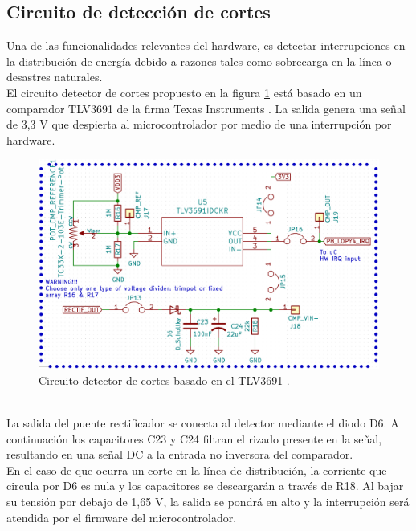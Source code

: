  \subsection{Circuito de detección de cortes}
 Una de las funcionalidades relevantes del hardware, es detectar interrupciones en la distribución de energía debido a razones tales como sobrecarga en la línea o desastres naturales.\\
 El circuito detector de cortes propuesto en la figura \ref{fig:ctodetectorcortes} está basado en un comparador TLV3691 de la firma Texas Instruments \citep{tlv3691}. La salida genera una señal de 3,3 V que despierta al microcontrolador por medio de una interrupci\'{o}n por hardware.\\
 \begin{figure}[h]
 	\centering
 	\includegraphics[width=0.9\linewidth]{Figures/cto_detector_cortes}
 	\caption{Circuito detector de cortes basado en el TLV3691 \citep{tlv3691}.}
 	\label{fig:ctodetectorcortes}
 \end{figure}\\
 La salida del puente rectificador se conecta al detector mediante el diodo D6. A continuación los capacitores C23 y C24 filtran el rizado presente en la señal, resultando en una señal DC a la entrada no inversora del comparador.\\
 En el caso de que ocurra un corte en la línea de distribución, la corriente que circula por D6 es nula y los capacitores se descargar\'{a}n a través de R18. Al bajar su tensión por debajo de 1,65 V, la salida se pondrá en alto y la interrupción será atendida por el firmware del microcontrolador.\\
 
